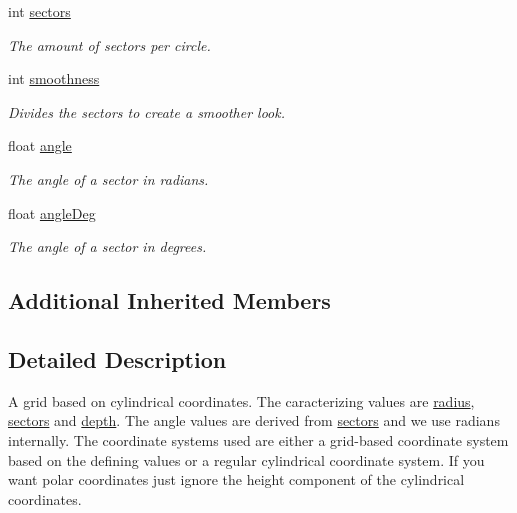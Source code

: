 \begin{DoxyCompactItemize}
int \hyperlink{class_g_f_polar_grid_a10ed1b65007dca14afb8fb6d22d36de0_a10ed1b65007dca14afb8fb6d22d36de0}{sectors}
\begin{DoxyCompactList}\small\item\em The amount of sectors per circle.\end{DoxyCompactList}\item 
int \hyperlink{class_g_f_polar_grid_a734237fa4e6ad811a84f36d6532ba9f9_a734237fa4e6ad811a84f36d6532ba9f9}{smoothness}
\begin{DoxyCompactList}\small\item\em Divides the sectors to create a smoother look.\end{DoxyCompactList}\item 
float \hyperlink{class_g_f_polar_grid_ad57e2dcf03806e576191953034dcd74c_ad57e2dcf03806e576191953034dcd74c}{angle}
\begin{DoxyCompactList}\small\item\em The angle of a sector in radians.\end{DoxyCompactList}\item 
float \hyperlink{class_g_f_polar_grid_a5c0e2072d09f3add6e4012b89ce8d21e_a5c0e2072d09f3add6e4012b89ce8d21e}{angle\+Deg}
\begin{DoxyCompactList}\small\item\em The angle of a sector in degrees.\end{DoxyCompactList}\end{DoxyCompactItemize}
\subsection*{Additional Inherited Members}


\subsection{Detailed Description}
A grid based on cylindrical coordinates. The caracterizing values are \hyperlink{class_g_f_polar_grid_a71bf429c8c2630684969db7f7483416a_a71bf429c8c2630684969db7f7483416a}{radius}, \hyperlink{class_g_f_polar_grid_a10ed1b65007dca14afb8fb6d22d36de0_a10ed1b65007dca14afb8fb6d22d36de0}{sectors} and \hyperlink{class_g_f_layered_grid_a3ff168354ca75d04aae2340c48c7070c_a3ff168354ca75d04aae2340c48c7070c}{depth}. The angle values are derived from \hyperlink{class_g_f_polar_grid_a10ed1b65007dca14afb8fb6d22d36de0_a10ed1b65007dca14afb8fb6d22d36de0}{sectors} and we use radians internally. The coordinate systems used are either a grid-\/based coordinate system based on the defining values or a regular cylindrical coordinate system. If you want polar coordinates just ignore the height component of the cylindrical coordinates.

